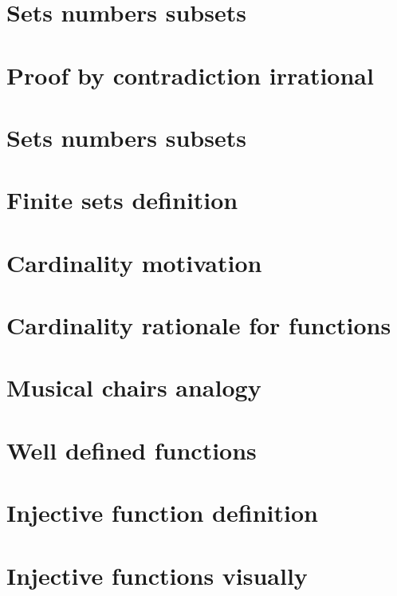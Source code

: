 \section*{Sets numbers subsets}

\vfill
\section*{Proof by contradiction irrational}

\vfill
\section*{Sets numbers subsets}

\vfill
\section*{Finite sets definition}

\vfill
\section*{Cardinality motivation}

\vfill
\section*{Cardinality rationale for functions}

\vfill
\section*{Musical chairs analogy}

\vfill
\section*{Well defined functions}

\vfill
\section*{Injective function definition}

\vfill
\section*{Injective functions visually}

\vfill
